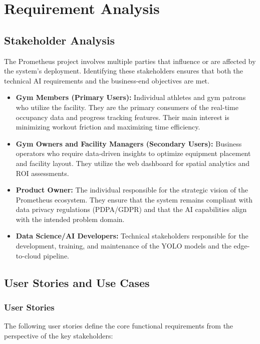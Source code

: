 \chapter{Requirement Analysis}
\label{chap:requirement-analysis}

\section{Stakeholder Analysis}
\label{section:stakeholder-analysis}

The Prometheus project involves multiple parties that influence or are affected by the system's deployment. Identifying these stakeholders ensures that both the technical AI requirements and the business-end objectives are met.

\begin{itemize}
    \item \textbf{Gym Members (Primary Users):} Individual athletes and gym patrons who utilize the facility. They are the primary consumers of the real-time occupancy data and progress tracking features. Their main interest is minimizing workout friction and maximizing time efficiency.
    \item \textbf{Gym Owners and Facility Managers (Secondary Users):} Business operators who require data-driven insights to optimize equipment placement and facility layout. They utilize the web dashboard for spatial analytics and ROI assessments.
    \item \textbf{Product Owner:} The individual responsible for the strategic vision of the Prometheus ecosystem. They ensure that the system remains compliant with data privacy regulations (PDPA/GDPR) and that the AI capabilities align with the intended problem domain.
    \item \textbf{Data Science/AI Developers:} Technical stakeholders responsible for the development, training, and maintenance of the YOLO models and the edge-to-cloud pipeline.
\end{itemize}

\section{User Stories and Use Cases}
\label{section:user-stories-use-cases}

\subsection{User Stories}
The following user stories define the core functional requirements from the perspective of the key stakeholders:

